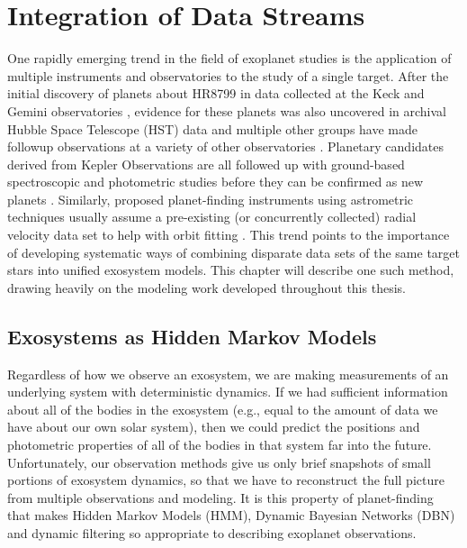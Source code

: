 \chapter{Integration of Data Streams}\label{ch:int_data}
One rapidly emerging trend in the field of exoplanet studies is the application of multiple instruments and observatories to the study of a single target.  After the initial discovery of planets about HR8799 in data collected at the Keck and Gemini observatories \citep{marois2008direct}, evidence for these planets was also uncovered in archival Hubble Space Telescope (HST) data \citep{lafreniere2009hst} and multiple other groups have made followup observations at a variety of other observatories \citep{hinz2010thermal,janson2010spatially}.   Planetary candidates derived from Kepler Observations are all followed up with ground-based spectroscopic and photometric studies before they can be confirmed as new planets \citep{borucki2010kepler,borucki2011characteristics}.  Similarly, proposed planet-finding instruments using astrometric techniques usually assume a pre-existing (or concurrently collected) radial velocity data set to help with orbit fitting \citep{catanzarite2006}.  This trend points to the importance of developing systematic ways of combining disparate data sets of the same target stars into unified exosystem models.  This chapter will describe one such method, drawing heavily on the modeling work developed throughout this thesis.

\section{Exosystems as Hidden Markov Models}\label{sec:hmm}
Regardless of how we observe an exosystem, we are making measurements of an underlying system with deterministic dynamics.  If we had sufficient information about all of the bodies in the exosystem (e.g., equal to the amount of data we have about our own solar system), then we could predict the positions and photometric properties of all of the bodies in that system far into the future.  Unfortunately, our observation methods give us only brief snapshots of small portions of exosystem dynamics, so that we have to reconstruct the full picture from multiple observations and modeling.  It is this property of planet-finding that makes Hidden Markov Models (HMM), Dynamic Bayesian Networks (DBN) and dynamic filtering so appropriate to describing exoplanet observations.

